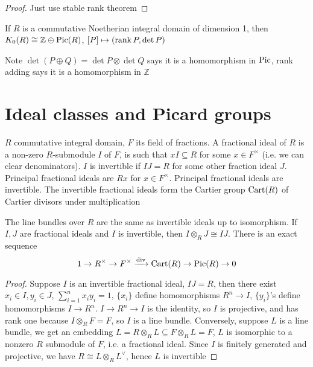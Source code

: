\documentclass[main]{subfiles}
\begin{document}
\begin{proof}
Just use stable rank theorem
\end{proof}

\begin{corollary}
If $R$ is a commutative Noetherian integral domain of dimension 1, then $K_0(R)\cong\mathbb Z\oplus\operatorname{Pic}(R)$, $[P]\mapsto(\operatorname{rank} P,\det P)$
\end{corollary}

Note $\det(P\oplus Q)=\det P\otimes\det Q$ says it is a homomorphism in $\operatorname{Pic}$, rank adding says it is a homomorphism in $\mathbb Z$

\section{Ideal classes and Picard groups}

$R$ commutative integral domain, $F$ its field of fractions. A fractional ideal of $R$ is a non-zero $R$-submodule $I$ of $F$, is such that $xI\subseteq R$ for some $x\in F^\times$ (i.e. we can clear denominators). $I$ is invertible if $IJ=R$ for some other fraction ideal $J$. Principal fractional ideals are $Rx$ for $x\in F^\times$. Principal fractional ideals are invertible. The invertible fractional ideals form the Cartier group $\operatorname{Cart}(R)$ of Cartier divisors under multiplication

\begin{proposition}
The line bundles over $R$ are the same as invertible ideals up to isomorphism. If $I,J$ are fractional ideals and $I$ is invertible, then $I\otimes_R J\cong IJ$. There is an exact sequence
\[1\to R^\times\to F^\times\xrightarrow{\operatorname{div}} \operatorname{Cart}(R)\to\operatorname{Pic}(R)\to0\]
\end{proposition}

\begin{proof}
Suppose $I$ is an invertible fractional ideal, $IJ=R$, then there exist $x_i\in I,y_i\in J$, $\sum_{i=1}^nx_iy_i=1$, $\{x_i\}$ define homomorphisms $R^n\to I$, $\{y_i\}$'s define homomorphisms $I\to R^n$. $I\to R^n\to I$ is the identity, so $I$ is projective, and has rank one because $I\otimes_RF=F$, so $I$ is a line bundle. Conversely, suppose $L$ is a line bundle, we get an embedding $L=R\otimes_R L\subseteq F\otimes_R L=F$, $L$ is isomorphic to a nonzero $R$ submodule of $F$, i.e. a fractional ideal. Since $I$ is finitely generated and projective, we have $R\cong L\otimes_R L^\vee$, hence $L$ is invertible
\end{proof}
\end{document}
